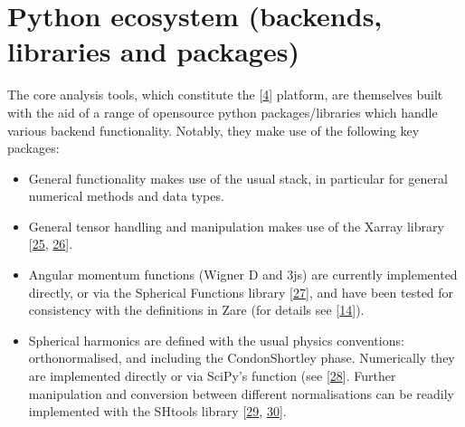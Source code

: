 \documentclass[letterpaper,table,10pt,english]{jupyterBook}
\begin{document}
\section{Python ecosystem (backends, libraries and packages)}
\label{\detokenize{part1/platform_intro_071122:python-ecosystem-backends-libraries-and-packages}}\label{\detokenize{part1/platform_intro_071122:sect-platform-pythonecosystem}}
\sphinxAtStartPar
The core analysis tools, which constitute the  {[}\hyperlink{cite.backmatter/bibliography:id574}{4}{]} platform, are themselves built with the aid of a range of open\sphinxhyphen{}source python packages/libraries which handle various backend functionality. Notably, they make use of the following key packages:
\begin{itemize}
\item {} 
\sphinxAtStartPar
General functionality makes use of the usual  stack, in particular  for general numerical methods and data types.

\item {} 
\sphinxAtStartPar
General tensor handling and manipulation makes use of the Xarray library {[}\hyperlink{cite.backmatter/bibliography:id586}{25}, \hyperlink{cite.backmatter/bibliography:id810}{26}{]}.

\item {} 
\sphinxAtStartPar
Angular momentum functions (Wigner D and 3js) are currently implemented directly, or via the Spherical Functions library {[}\hyperlink{cite.backmatter/bibliography:id448}{27}{]}, and have been tested for consistency with the definitions in Zare (for details see  {[}\hyperlink{cite.backmatter/bibliography:id506}{14}{]}).

\item {} 
\sphinxAtStartPar
Spherical harmonics are defined with the usual physics conventions: orthonormalised, and including the Condon\sphinxhyphen{}Shortley phase. Numerically they are implemented directly or via SciPy’s  function (see  {[}\hyperlink{cite.backmatter/bibliography:id730}{28}{]}. Further manipulation and conversion between different normalisations can be readily implemented with the SHtools library {[}\hyperlink{cite.backmatter/bibliography:id800}{29}, \hyperlink{cite.backmatter/bibliography:id740}{30}{]}.


\end{itemize}
\end{document}
